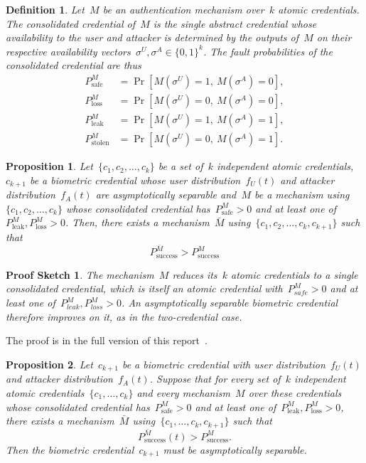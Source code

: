 \documentclass[conference,compsoc]{IEEEtran}
\newtheorem{proposition}{Proposition}
\newtheorem*{proofsketch}{Proof Sketch}
\newtheorem{definition}{Definition}
\begin{document}
\begin{definition}
Let~$M$ be an authentication mechanism over~$k$ atomic credentials. The \emph{consolidated credential} of~$M$ is the single abstract credential whose availability to the user and attacker is determined by the outputs of~$M$ on their respective availability vectors~$\sigma^U,\sigma^A\in\{0,1\}^k$. The fault probabilities of the consolidated credential are thus
\begin{align*}
P^M_{\text{safe}}
&=
\Pr\left[M(\sigma^U)=1,\ M(\sigma^A)=0\right],\\
P^M_{\text{loss}}
&=
\Pr\left[M(\sigma^U)=0,\ M(\sigma^A)=0\right],\\
P^M_{\text{leak}}
&=
\Pr\left[M(\sigma^U)=1,\ M(\sigma^A)=1\right],\\
P^M_{\text{stolen}}
&=
\Pr\left[M(\sigma^U)=0,\ M(\sigma^A)=1\right].
\end{align*}
\end{definition}
\begin{proposition}\label{thm:suf_nec_cond_for_improve_k_atm}
    Let~$\{c_1,c_2,\ldots,c_k\}$ be a set of~$k$ independent atomic credentials,~$c_{k+1}$ be a biometric credential whose user distribution~$f_U(t)$ and attacker distribution~$f_A(t)$ are asymptotically separable and~$M$ be a mechanism using~$\{c_1,c_2,\ldots,c_k\}$ whose consolidated credential has~$P^M_\text{safe} > 0$ and at least one of~$P^M_\text{leak},P^M_\text{loss} > 0$. Then, there exists a mechanism~$\bar{M}$ using~$\{c_1,c_2,\ldots,c_k,c_{k+1}\}$ such that
    \begin{equation*}
        P_{\mathrm{success}}^{\bar{M}} > P_{\mathrm{success}}^{M}
    \end{equation*}
\end{proposition}
\begin{proofsketch}
The mechanism~$M$ reduces its~$k$ atomic credentials to a single consolidated credential, which is itself an atomic credential with~$P^M_{safe} > 0$ and at least one of~$P^M_{leak}, P^M_{loss} > 0$.
An asymptotically separable biometric credential therefore improves on it, as in the two-credential case.
\end{proofsketch}
The proof is in the full version of this report~\cite{biometric_full_version}.
\begin{proposition}\label{thm:nec_cond_for_improve_k_atm}
    Let~$c_{k+1}$ be a biometric credential with user distribution~$f_U(t)$ and attacker distribution~$f_A(t)$. Suppose that for every set of~$k$ independent atomic credentials~$\{c_1,\ldots,c_k\}$ and every mechanism~$M$ over these credentials whose consolidated credential has~$P^M_\text{safe} > 0$ and at least one of~$P^M_\text{leak},P^M_\text{loss} > 0$, there exists a mechanism~$\bar{M}$ using~$\{c_1,\ldots,c_k,c_{k+1}\}$ such that
    \begin{equation*}
    P^{\bar{M}}_{\text{success}}(t) > P^{M}_{\text{success}}.
    \end{equation*}
    Then the biometric credential~$c_{k+1}$ must be asymptotically separable.
\end{proposition} 
\end{document}
